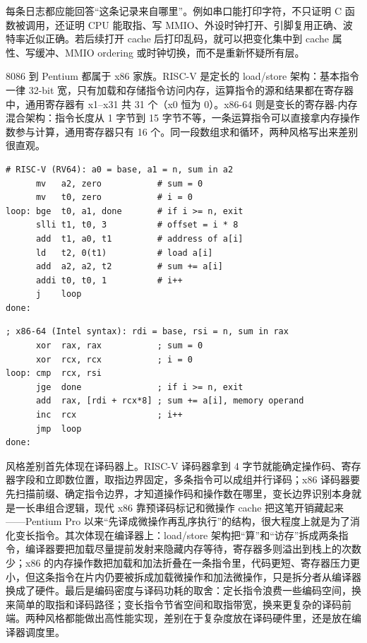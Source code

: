 每条日志都应能回答“这条记录来自哪里”。例如串口能打印字符，不只证明 C 函数被调用，还证明 CPU 能取指、写 MMIO、外设时钟打开、引脚复用正确、波特率近似正确。若后续打开 cache 后打印乱码，就可以把变化集中到 cache 属性、写缓冲、MMIO ordering 或时钟切换，而不是重新怀疑所有层。

8086 到 Pentium 都属于 x86 家族。RISC-V 是定长的 load/store 架构：基本指令一律 32-bit 宽，只有加载和存储指令访问内存，运算指令的源和结果都在寄存器中，通用寄存器有 x1--x31 共 31 个（x0 恒为 0）。x86-64 则是变长的寄存器-内存混合架构：指令长度从 1 字节到 15 字节不等，一条运算指令可以直接拿内存操作数参与计算，通用寄存器只有 16 个。同一段数组求和循环，两种风格写出来差别很直观。

\begin{lstlisting}
# RISC-V (RV64): a0 = base, a1 = n, sum in a2
      mv   a2, zero           # sum = 0
      mv   t0, zero           # i = 0
loop: bge  t0, a1, done       # if i >= n, exit
      slli t1, t0, 3          # offset = i * 8
      add  t1, a0, t1         # address of a[i]
      ld   t2, 0(t1)          # load a[i]
      add  a2, a2, t2         # sum += a[i]
      addi t0, t0, 1          # i++
      j    loop
done:
\end{lstlisting}

\begin{lstlisting}
; x86-64 (Intel syntax): rdi = base, rsi = n, sum in rax
      xor  rax, rax           ; sum = 0
      xor  rcx, rcx           ; i = 0
loop: cmp  rcx, rsi
      jge  done               ; if i >= n, exit
      add  rax, [rdi + rcx*8] ; sum += a[i], memory operand
      inc  rcx                ; i++
      jmp  loop
done:
\end{lstlisting}

风格差别首先体现在译码器上。RISC-V 译码器拿到 4 字节就能确定操作码、寄存器字段和立即数位置，取指边界固定，多条指令可以成组并行译码；x86 译码器要先扫描前缀、确定指令边界，才知道操作码和操作数在哪里，变长边界识别本身就是一长串组合逻辑，现代 x86 靠预译码标记和微操作 cache 把这笔开销藏起来——Pentium Pro 以来“先译成微操作再乱序执行”的结构，很大程度上就是为了消化变长指令。其次体现在编译器上：load/store 架构把“算”和“访存”拆成两条指令，编译器要把加载尽量提前发射来隐藏内存等待，寄存器多则溢出到栈上的次数少；x86 的内存操作数把加载和加法折叠在一条指令里，代码更短、寄存器压力更小，但这条指令在片内仍要被拆成加载微操作和加法微操作，只是拆分者从编译器换成了硬件。最后是编码密度与译码功耗的取舍：定长指令浪费一些编码空间，换来简单的取指和译码路径；变长指令节省空间和取指带宽，换来更复杂的译码前端。两种风格都能做出高性能实现，差别在于复杂度放在译码硬件里，还是放在编译器调度里。

